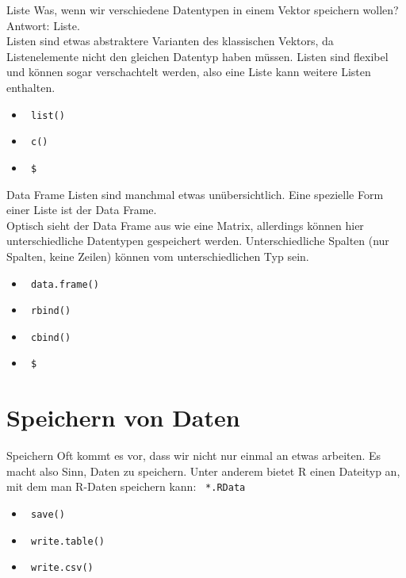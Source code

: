 \documentclass[aspectratio = 169]{chariteBeamer}
\begin{document}
\begin{frame}[fragile]{Liste}
	Was, wenn wir verschiedene Datentypen in einem Vektor speichern wollen? \\
	Antwort: Liste.\\
	Listen sind etwas abstraktere Varianten des klassischen Vektors, da Listenelemente nicht den gleichen Datentyp haben müssen. Listen sind flexibel und können sogar verschachtelt werden, also eine Liste kann weitere Listen enthalten.
	\begin{itemize}
		\item \verb+ list()+
		\item \verb+ c()+
		\item \verb+ $ +
	\end{itemize}
\end{frame}

\begin{frame}[fragile]{Data Frame}
	Listen sind manchmal etwas unübersichtlich. Eine spezielle Form einer Liste ist der Data Frame.\\
	Optisch sieht der Data Frame aus wie eine Matrix, allerdings können hier unterschiedliche Datentypen gespeichert werden. Unterschiedliche Spalten (nur Spalten, keine Zeilen) können vom unterschiedlichen Typ sein.
	\begin{itemize}
		\item \verb+ data.frame()+
		\item \verb+ rbind()+
		\item \verb+ cbind()+
		\item \verb+ $+
	\end{itemize}
\end{frame}

\section{Speichern von Daten}

\begin{frame}[fragile]{Speichern}
	Oft kommt es vor, dass wir nicht nur einmal an etwas arbeiten. Es macht also Sinn, Daten zu speichern. Unter anderem bietet R einen Dateityp an, mit dem man R-Daten speichern kann: \verb+ *.RData+
	\begin{itemize}
		\item \verb+ save()+
		\item \verb+ write.table()+
		\item \verb+ write.csv()+
	\end{itemize}
\end{frame}
\end{document}
